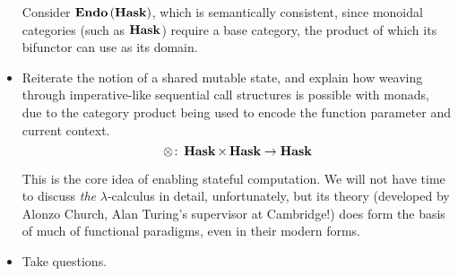 \documentclass[12pt]{article}
\DeclareMathOperator{\catendo}{\text{\textbf{Endo}}}
\DeclareMathOperator{\cathask}{\text{\textbf{Hask}}}
\begin{document}
\begin{itemize}
        Consider $\catendo{(\cathask)}$, which is semantically consistent, since
        monoidal categories (such as $\cathask$) require a base category, the
        product of which its bifunctor can use as its domain.
        \item Reiterate the notion of a shared mutable state, and explain how
        weaving through imperative-like sequential call structures is possible
        with monads, due to the category product being used to encode the
        function parameter and current context.
        \begin{equation*}
                \otimes \colon \cathask \times \cathask \to \cathask
        \end{equation*}

        This is the core idea of enabling stateful computation. We will not have
        time to discuss \emph{the} $\lambda$-calculus in detail, unfortunately,
        but its theory (developed by Alonzo Church, Alan Turing's supervisor at
        Cambridge!) does form the basis of much of functional paradigms, even in
        their modern forms.
        \item Take questions.
\end{itemize}
\end{document}
